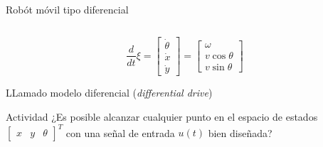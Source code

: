 \documentclass[presentation,aspectratio=169]{beamer}
\begin{document}
\begin{frame}[label={sec:orgef1dcd9}]{Robót móvil tipo diferencial}
\begin{columns}
\begin{column}{0.6\columnwidth}
\[\frac{d}{dt} \xi = \begin{bmatrix} \dot{\theta}\\\dot{x}\\\dot{y} \end{bmatrix} = \begin{bmatrix} \omega\\ v\cos\theta\\v\sin\theta\end{bmatrix} \]

LLamado modelo \alert{diferencial} (\emph{differential drive})

\pause

\alert{Actividad} ¿Es posible alcanzar cualquier punto en el espacio de estados \(\begin{bmatrix} x &  y & \theta \end{bmatrix}^T\) con una señal de entrada \(u(t)\) bien diseñada?
\end{column}
\end{columns}
\end{frame}
\end{document}
